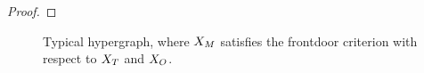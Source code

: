 \begin{proof}
\end{proof}


\begin{figure}[t]
    
    \caption{Typical hypergraph, where $X_{M}$ satisfies the frontdoor criterion with respect to $X_{T}$ and $X_{O}$.}
    \label{fig:frontdoorCriterion}
\end{figure}